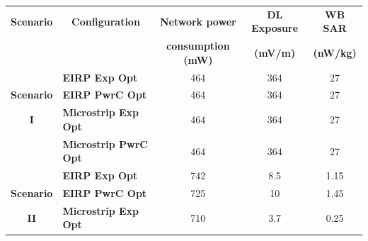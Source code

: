 \begin{table}[h!]
\begin{tabular}{|c|l|c|c|c|}
\hline                                                                                             %
\multicolumn{1}{|c|}{\textbf{Scenario}}                           &\multicolumn{1}{c|}{\textbf{Configuration}}& \textbf{Network power}                  & \textbf{DL Exposure}        & \textbf{WB SAR}         \\ 
                                                                  &                                          & \textbf{consumption (mW)}               & \textbf{(mV/m)}             & \textbf{(nW/kg)}        \\ \hline
                                                                  & \textbf{EIRP \acs{Exp Opt}}              &    464                                  &      364                    &     27                  \\ \cline{2-5}
\textbf{Scenario}                                                 & \textbf{EIRP \acs{PwrC Opt}}             &    464                                  &      364                    &     27                  \\ \cline{2-5} 
\textbf{I}                                                        & \textbf{Microstrip \acs{Exp Opt}}        &    464                                  &      364                    &     27                  \\ \cline{2-5} 
                                                                  & \textbf{Microstrip \acs{PwrC Opt}}       &    464                                  &      364                    &     27                  \\ \hline
                                                                  & \textbf{EIRP \acs{Exp Opt}}              &    742                                  &      8.5                    &     1.15                \\ \cline{2-5} 
 \textbf{Scenario}                                                & \textbf{EIRP \acs{PwrC Opt}}             &    725                                  &      10                     &     1.45                \\ \cline{2-5} 
 \textbf{II}                                                      & \textbf{Microstrip \acs{Exp Opt}}        &    710                                  &      3.7                    &     0.25                \\ \cline{2-5} 

\end{tabular}
\end{table}
